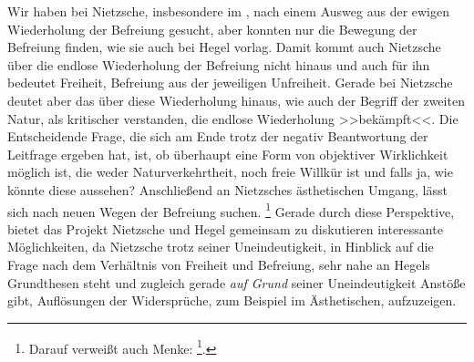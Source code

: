 \documentclass[12pt, a4paper, openany]{report}
\begin{document}
Wir haben bei Nietzsche, insbesondere im , nach einem Ausweg aus der ewigen Wiederholung der Befreiung gesucht, aber konnten nur die Bewegung der Befreiung finden, wie sie auch bei Hegel vorlag. 
Damit kommt auch Nietzsche über die endlose Wiederholung der Befreiung nicht hinaus und auch für ihn bedeutet Freiheit, Befreiung aus der jeweiligen Unfreiheit. 
Gerade bei Nietzsche deutet aber das  über diese Wiederholung hinaus, wie auch der Begriff der zweiten Natur, als kritischer verstanden, die endlose Wiederholung >>bekämpft<<. 
Die Entscheidende Frage, die sich am Ende trotz der negativ Beantwortung der Leitfrage ergeben hat, ist, ob überhaupt eine Form von objektiver Wirklichkeit möglich ist, die weder Naturverkehrtheit, noch freie Willkür ist und falls ja, wie könnte diese aussehen?
Anschließend an Nietzsches ästhetischen Umgang, lässt sich nach neuen Wegen der Befreiung suchen.%
\footnote{
    Darauf verweißt auch Menke: \footcite[][50]{menke_autonomie_2018}.
}
Gerade durch diese Perspektive, bietet das Projekt Nietzsche und Hegel gemeinsam zu diskutieren interessante Möglichkeiten, da Nietzsche trotz seiner Uneindeutigkeit, in Hinblick auf die Frage nach dem Verhältnis von Freiheit und Befreiung, sehr nahe an Hegels Grundthesen steht und zugleich gerade \emph{auf Grund} seiner Uneindeutigkeit Anstöße gibt, Auflösungen der Widersprüche, zum Beispiel im Ästhetischen, aufzuzeigen.

\backmatter
\printbibliography
 
\end{document}
